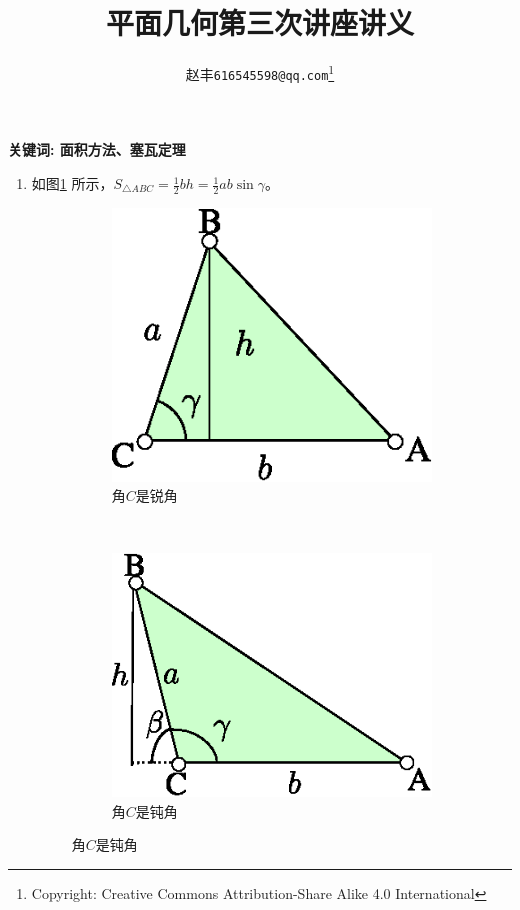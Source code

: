 \documentclass[12pt]{article}
\begin{document}
\title{平面几何第三次讲座讲义}
\author{赵丰\footnotesize \texttt{616545598@qq.com}\footnote{Copyright: Creative Commons Attribution-Share Alike 4.0 International}}
\maketitle
{\bf 关键词: 面积方法、塞瓦定理}
\begin{enumerate}
\item 
如图\ref{fig:Triangle.TrigArea} 所示，$S_{\triangle ABC}=\frac{1}{2}bh=\frac{1}{2}ab\sin\gamma$。


    \begin{figure}[!ht]
    \centering
    \begin{subfigure}[b]{0.42\textwidth}
    \includegraphics[width=\textwidth]{Triangle_TrigArea.eps}
    \caption{角$C$是锐角}\label{fig:Triangle.TrigArea}
    \end{subfigure}~
    \begin{subfigure}[b]{0.48\textwidth}

    \includegraphics[width=\textwidth]{Triangle_TrigArea2.eps}
    \caption{角$C$是钝角}\label{fig:Triangle.TrigArea2}
    \end{subfigure}
    \end{figure}


\end{enumerate}
\end{document}
